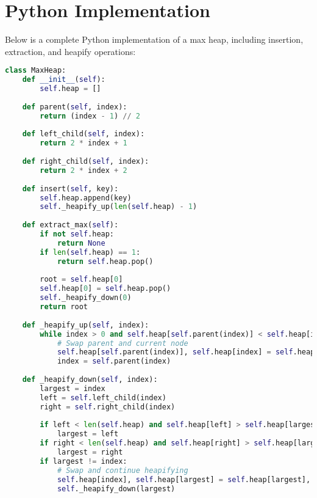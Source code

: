 \section*{Python Implementation}


Below is a complete Python implementation of a max heap, including insertion, extraction, and heapify operations:

\begin{fullwidth}
\begin{lstlisting}[language=Python]
class MaxHeap:
    def __init__(self):
        self.heap = []
    
    def parent(self, index):
        return (index - 1) // 2
    
    def left_child(self, index):
        return 2 * index + 1
    
    def right_child(self, index):
        return 2 * index + 2
    
    def insert(self, key):
        self.heap.append(key)
        self._heapify_up(len(self.heap) - 1)
    
    def extract_max(self):
        if not self.heap:
            return None
        if len(self.heap) == 1:
            return self.heap.pop()
        
        root = self.heap[0]
        self.heap[0] = self.heap.pop()
        self._heapify_down(0)
        return root
    
    def _heapify_up(self, index):
        while index > 0 and self.heap[self.parent(index)] < self.heap[index]:
            # Swap parent and current node
            self.heap[self.parent(index)], self.heap[index] = self.heap[index], self.heap[self.parent(index)]
            index = self.parent(index)
    
    def _heapify_down(self, index):
        largest = index
        left = self.left_child(index)
        right = self.right_child(index)
        
        if left < len(self.heap) and self.heap[left] > self.heap[largest]:
            largest = left
        if right < len(self.heap) and self.heap[right] > self.heap[largest]:
            largest = right
        if largest != index:
            # Swap and continue heapifying
            self.heap[index], self.heap[largest] = self.heap[largest], self.heap[index]
            self._heapify_down(largest)
    

\end{lstlisting}
\end{fullwidth}
